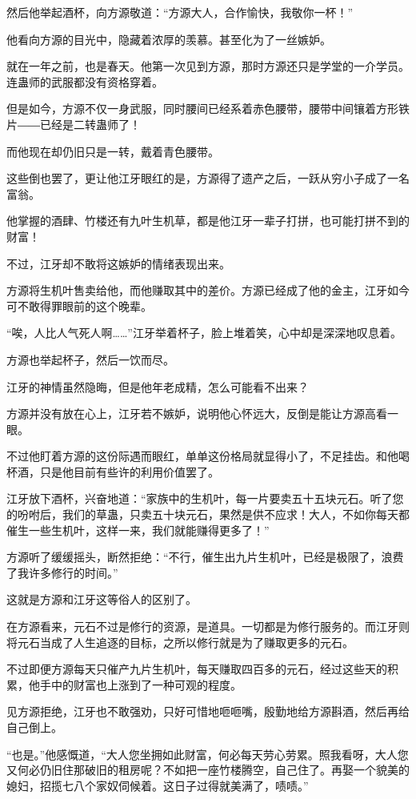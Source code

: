 \begin{this_body}
然后他举起酒杯，向方源敬道：“方源大人，合作愉快，我敬你一杯！”

他看向方源的目光中，隐藏着浓厚的羡慕。甚至化为了一丝嫉妒。

就在一年之前，也是春天。他第一次见到方源，那时方源还只是学堂的一介学员。连蛊师的武服都没有资格穿着。

但是如今，方源不仅一身武服，同时腰间已经系着赤色腰带，腰带中间镶着方形铁片――已经是二转蛊师了！

而他现在却仍旧只是一转，戴着青色腰带。

这些倒也罢了，更让他江牙眼红的是，方源得了遗产之后，一跃从穷小子成了一名富翁。

他掌握的酒肆、竹楼还有九叶生机草，都是他江牙一辈子打拼，也可能打拼不到的财富！

不过，江牙却不敢将这嫉妒的情绪表现出来。

方源将生机叶售卖给他，而他赚取其中的差价。方源已经成了他的金主，江牙如今可不敢得罪眼前的这个晚辈。

“唉，人比人气死人啊……”江牙举着杯子，脸上堆着笑，心中却是深深地叹息着。

方源也举起杯子，然后一饮而尽。

江牙的神情虽然隐晦，但是他年老成精，怎么可能看不出来？

方源并没有放在心上，江牙若不嫉妒，说明他心怀远大，反倒是能让方源高看一眼。

不过他盯着方源的这份际遇而眼红，单单这份格局就显得小了，不足挂齿。和他喝杯酒，只是他目前有些许的利用价值罢了。

江牙放下酒杯，兴奋地道：“家族中的生机叶，每一片要卖五十五块元石。听了您的吩咐后，我们的草蛊，只卖五十块元石，果然是供不应求！大人，不如你每天都催生一些生机叶，这样一来，我们就能赚得更多了！”

方源听了缓缓摇头，断然拒绝：“不行，催生出九片生机叶，已经是极限了，浪费了我许多修行的时间。”

这就是方源和江牙这等俗人的区别了。

在方源看来，元石不过是修行的资源，是道具。一切都是为修行服务的。而江牙则将元石当成了人生追逐的目标，之所以修行就是为了赚取更多的元石。

不过即便方源每天只催产九片生机叶，每天赚取四百多的元石，经过这些天的积累，他手中的财富也上涨到了一种可观的程度。

见方源拒绝，江牙也不敢强劝，只好可惜地咂咂嘴，殷勤地给方源斟酒，然后再给自己倒上。

“也是。”他感慨道，“大人您坐拥如此财富，何必每天劳心劳累。照我看呀，大人您又何必仍旧住那破旧的租房呢？不如把一座竹楼腾空，自己住了。再娶一个貌美的媳妇，招揽七八个家奴伺候着。这日子过得就美满了，啧啧。”


\end{this_body}
